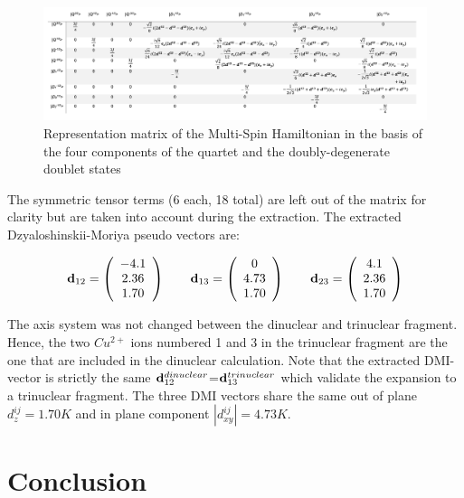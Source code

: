 \documentclass[10pt]{report}
\numberwithin{equation}{section}
\begin{document}
\begin{landscape}
\begin{figure}[!ht]
    \centering
    \includegraphics[width=\textwidth]{Images/HMS.png}
    \caption{Representation matrix of the Multi-Spin Hamiltonian in the basis of the four components of the quartet and the doubly-degenerate doublet states}
    \label{fig:HMS3corps}
\end{figure}
\end{landscape}

The symmetric tensor terms (6 each, 18 total) are left out of the matrix for clarity but are taken into account during the extraction.
The extracted Dzyaloshinskii-Moriya pseudo vectors are:

\[     \vb{d}_{12}=
\left( \begin{array}{c}
-4.1  \\
2.36  \\
1.70
\end{array} \right)
    \qquad
    \vb{d}_{13}=
    \left( \begin{array}{c}
    0  \\
    4.73  \\
    1.70
    \end{array} \right)
    \qquad    \vb{d}_{23}=
    \left( \begin{array}{c}
    4.1  \\
    2.36  \\
    1.70
    \end{array} \right)
    \]

The axis system was not changed between the dinuclear and trinuclear fragment. Hence, the two $Cu^{2+}$ ions numbered 1 and 3 in the trinuclear fragment are the one that are included in the dinuclear calculation.
Note that the extracted DMI-vector is strictly the same $\vb{d}_{12}^{dinuclear}$=$\vb{d}_{13}^{trinuclear}$ which validate the expansion to a trinuclear fragment.
The three DMI vectors share the same out of plane $d_z^{ij}=1.70K$ and in plane component $|d_{xy}^{ij}|=4.73K$.



\section{Conclusion}
\end{document}
